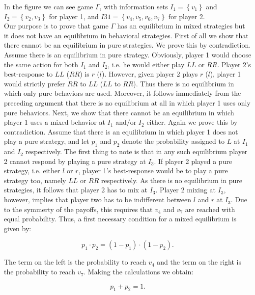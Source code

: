 \begin{example}
In the figure we can see game $\Gamma$, with information sets $I_1 = \left \{ v_1 \right \}$ and $I_2 = \left \{ v_2,v_3 \right \}$ for player 1, and $I31 = \left \{ v_4,v_5,v_6,v_7 \right \}$ for player 2. \\
Our purpose is to prove that game $\Gamma$ has an equilibrium in mixed strategies but it does not have an equilibrium in behavioral strategies. 
First of all we show that there cannot be an equilibrium in pure strategies. We prove this by contradiction. Assume there is an equilibrium in pure strategy. Obviously, player 1 would choose the same action for both $I_1$ and $I_2$, i.e. he would either play $LL$ or $RR$. Player 2's best-response to $LL$ ($RR$) is $r$ ($l$). However, given player 2 plays $r$ ($l$), player 1 would strictly prefer $RR$ to $LL$ ($LL$ to $RR$). Thus there is no equilibrium in which only pure behaviors are used. Moreover, it follows immediately from the preceding argument that there is no equilibrium at all in which player 1 uses only pure behaviors.
Next, we show that there cannot be an equilibrium in which player 1 uses a mixed behavior at $I_1$ and$/$or $I_2$ either. Again we prove this by contradiction. Assume that there is an equilibrium in which player 1 does not play a pure strategy, and let $p_1$ and $p_2$ denote the probability assigned to $L$ at $I_1$ and $I_2$ respectively. The first thing to note is that in any such equilibrium player 2 cannot respond by playing a pure strategy at $I_3$. If player 2 played a pure strategy, i.e. either $l$ or $r$, player 1's best-response would be to play a pure strategy too, namely $LL$ or $RR$ respectively. As there is no equilibrium in pure strategies, it follows that player 2 has to mix at $I_3$.
Player 2 mixing at $I_3$, however, implies that player two has to be indifferent between $l$ and $r$ at $I_3$. Due to the symmerty of the payoffs, this requires that $v_4$ and $v_7$ are reached with equal probability. Thus, a first necessary condition for a mixed equilibrium is given by: 

\begin{equation}
p_1 \cdot p_2 = (1-p_1) \cdot (1-p_2).
\end{equation}

\noindent
The term on the left is the probability to reach $v_4$ and the term on the right is the probability to reach $v_7$. Making the calculations we obtain:

\begin{equation}
p_1 + p_2 = 1.
\end{equation}


\end{example}
